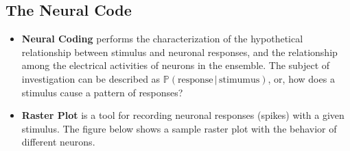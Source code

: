 \documentclass[11pt]{article}
\begin{document}
\subsection{The Neural Code}
\begin{itemize}
    \item \textbf{Neural Coding} performs the characterization of the hypothetical relationship between stimulus and neuronal responses, and the relationship among the electrical activities of neurons in the ensemble.  The subject of investigation can be described as $\mathbb{P} (\text{response}\,|\,\text{stimumus})$, or, how does a stimulus cause a pattern of responses? 
    \item \textbf{Raster Plot} is a tool for recording neuronal responses (spikes) with a given stimulus. The figure below shows a sample raster plot with the behavior of different neurons.
    \begin{center}
\end{center}
\end{itemize}
\end{document}
